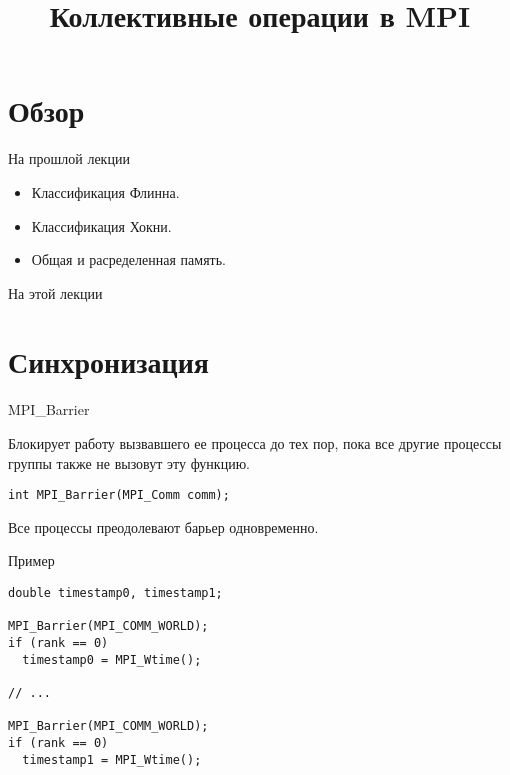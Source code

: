 

\title{Коллективные операции в MPI}



\begin{frame}
\titlepage
\end{frame}

\section*{Обзор}

\begin{frame}{На прошлой лекции}
\begin{itemize}
\ifmipt
    \item Классификация Флинна.
    \item Классификация Хокни.
    \item Общая и расределенная память.
\fi
\end{itemize}
\end{frame}

\begin{frame}{На этой лекции}
\tableofcontents
\end{frame} 


\section{Синхронизация}

\begin{frame}[fragile]{MPI_Barrier}

Блокирует работу вызвавшего ее процесса до тех пор, пока все другие процессы группы также не вызовут эту функцию.

\begin{lstlisting}
int MPI_Barrier(MPI_Comm comm);
\end{lstlisting}

Все процессы преодолевают барьер одновременно.

\end{frame}

\begin{frame}[fragile]{Пример}

\begin{lstlisting}
double timestamp0, timestamp1;

MPI_Barrier(MPI_COMM_WORLD);
if (rank == 0)
  timestamp0 = MPI_Wtime();

// ...

MPI_Barrier(MPI_COMM_WORLD);
if (rank == 0)
  timestamp1 = MPI_Wtime();
\end{lstlisting}

\end{frame}

